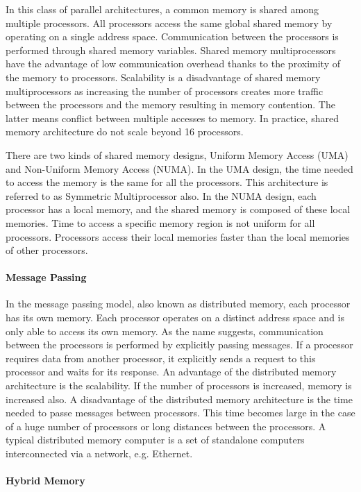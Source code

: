 In this class of parallel architectures, a common memory is shared among multiple processors. All processors access the same global shared memory by operating on a single address space. Communication between the processors is performed through shared memory variables. Shared memory multiprocessors have the advantage of low communication overhead thanks to the proximity of the memory to processors. Scalability is a disadvantage of shared memory multiprocessors as increasing the number of processors creates more traffic between the processors and the memory resulting in memory contention. The latter means conflict between multiple accesses to memory. In practice, shared memory architecture do not scale beyond 16 processors.  

There are two kinds of shared memory designs, Uniform Memory Access (UMA) and Non-Uniform Memory Access (NUMA). In the UMA design, the time needed to access the memory is the same for all the processors. This architecture is referred to as Symmetric Multiprocessor also. In the NUMA design, each processor has a local memory, and the shared memory is composed of these local memories. Time to access a specific memory region is not uniform for all processors. Processors access their local memories faster than the local memories of other processors.

\paragraph{Message Passing} In the message passing model, also known as distributed memory, each processor has its own memory. Each processor operates on a distinct address space and is only able to access its own memory. As the name suggests, communication between the processors is performed by explicitly passing messages. If a processor requires data from another processor, it explicitly sends a request to this processor and waits for its response. An advantage of the distributed memory architecture is the scalability. If the number of processors is increased, memory is increased also. A disadvantage of the distributed memory architecture is the time needed to passe messages between processors. This time becomes large in the case of a huge number of processors or long distances between the processors. A typical distributed memory computer is a set of standalone computers interconnected via a network, e.g. Ethernet.

\paragraph{Hybrid Memory}

